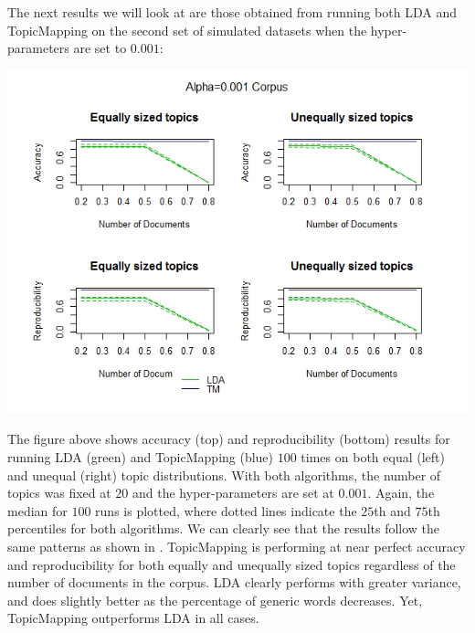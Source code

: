 \documentclass[12pt]{article}
\begin{document}
\noindent The next results we will look at are those obtained from running both LDA and TopicMapping on the second set of simulated datasets when the hyper-parameters are set to $0.001$:
\vspace{2mm}
\begin{center}
	\includegraphics[scale=0.8]{Images/plot_Alpha1.jpeg}
\end{center} 
\vspace{2mm}

\noindent The figure above shows accuracy (top) and reproducibility (bottom) results for running LDA (green) and TopicMapping (blue) $100$ times on both equal (left) and unequal (right) topic distributions. With both algorithms, the number of topics was fixed at $20$ and the hyper-parameters are set at $0.001$. Again, the median for $100$ runs is plotted, where dotted lines indicate the $25$th and $75$th percentiles for both algorithms. We can clearly see that the results follow the same patterns as shown in \cite{main}. TopicMapping is performing at near perfect accuracy and reproducibility for both equally and unequally sized topics regardless of the number of documents in the corpus. LDA clearly performs with greater variance, and does slightly better as the percentage of generic words decreases. Yet, TopicMapping outperforms LDA in all cases.
\\
\end{document}
